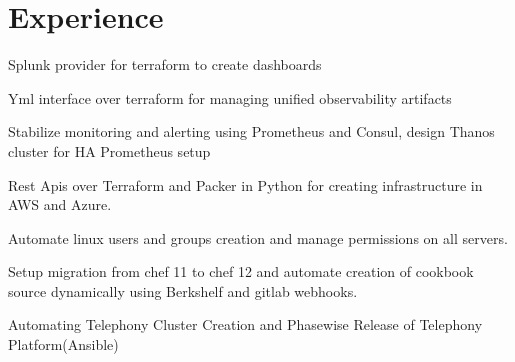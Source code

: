 \documentclass[]{deedy-resume-openfont}
\begin{document}
\hfill
\begin{minipage}[t]{0.66\textwidth}


\section{Experience}

\vspace{\topsep} %
\begin{tightemize}
\item Splunk provider for terraform to create dashboards
\item Yml interface over terraform for managing unified observability artifacts 
\end{tightemize}
\sectionsep
{}
\vspace{\topsep} %
\begin{tightemize}
\item Stabilize monitoring and alerting using Prometheus and Consul, design Thanos cluster for HA Prometheus setup
\end{tightemize}
\sectionsep

\vspace{\topsep} %
\begin{tightemize}
\item Rest Apis over Terraform and Packer in Python for creating infrastructure in AWS and Azure.
\item Automate linux users and groups creation and manage permissions on all servers.
\item Setup migration from chef 11 to chef 12 and automate creation of cookbook source dynamically using Berkshelf and gitlab webhooks.
\end{tightemize}
\sectionsep

\begin{tightemize}
\item Automating Telephony Cluster Creation and Phasewise Release of Telephony Platform(Ansible)
\end{tightemize}
\sectionsep


\end{minipage}
\end{document}
